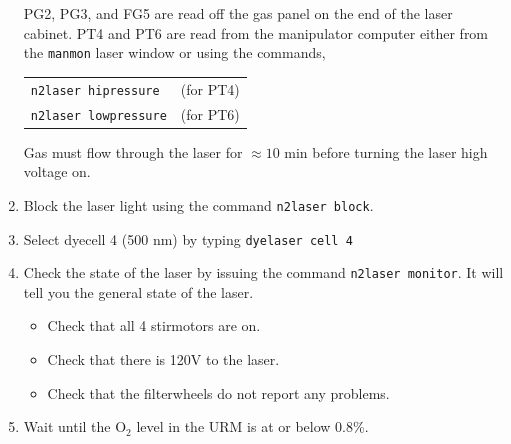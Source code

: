 \documentclass[11pt]{article}
\begin{document}
\begin{enumerate}
\begin{center}
\begin{tabular}{|l|c|c|}
&&\\
\hline
\end{tabular}
\end{center}
PG2, PG3, and FG5 are read off the gas panel on the end of the laser cabinet. PT4 and PT6 are read from the manipulator computer either from the \verb+manmon+ laser window or using the commands,
\begin{center}
\begin{tabular}{ll}
\verb+n2laser hipressure+ & (for PT4) \\
\verb+n2laser lowpressure+ & (for PT6) \\
\end{tabular}
\end{center}
Gas must flow through the laser for $\approx 10$ min before turning the laser high voltage on.
\item \CheckBox[name=rluo25]{} Block the laser light using the command \verb+n2laser block+.
\item \CheckBox[name=rluo26]{} Select dyecell 4 (500 nm) by typing \verb+dyelaser cell 4+
\item \CheckBox[name=rluo27]{} Check the state of the laser by issuing the command \verb+n2laser monitor+. It will tell you the general state of the laser. 
	\begin{itemize}
	\item \CheckBox[name=lst1]{} Check that all 4 stirmotors are on.
	\item \CheckBox[name=lst2]{} Check that there is 120V to the laser.
	\item \CheckBox[name=lst3]{} Check that the filterwheels do not report any problems.
	\end{itemize}
\item {} Wait until the O$_2$ level in the URM is at or below 0.8\%.

\end{enumerate}
\end{document}
